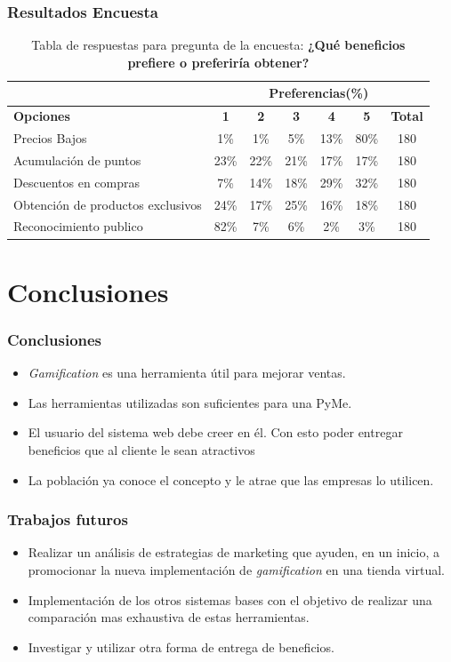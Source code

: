 \documentclass[10pt, compress]{beamer}
\begin{document}
\begin{frame}
 \frametitle{Resultados Encuesta}

\begin{table}[h]
\centering
\footnotesize
\begin{tabular}{|l|c|c|c|c|c|c|}
\hline
 & \multicolumn{6}{c|}{{\bf Preferencias(\%)}} \\
\hline
{\bf Opciones} & {\bf 1} & {\bf 2} & {\bf 3} & {\bf 4} & {\bf 5} & {\bf Total}\\
\hline
Precios Bajos & 1\% & 1\% & 5\% & 13\% & 80\% & 180\\
\hline
Acumulación de puntos & 23\% & 22\% & 21\% & 17\% & 17\% & 180\\
\hline
Descuentos en compras & 7\% & 14\% & 18\% & 29\% & 32\% & 180\\
\hline
Obtención de productos exclusivos & 24\% & 17\% & 25\% & 16\% & 18\% & 180\\
\hline
Reconocimiento publico & 82\% & 7\% & 6\% & 2\% & 3\% & 180\\
\hline
\end{tabular}
\caption{Tabla de respuestas para pregunta de la encuesta: {\bf ¿Qué beneficios prefiere o preferiría obtener?}}
\label{tab:Preg7}
\end{table}

\end{frame}

\section{Conclusiones}

\begin{frame}
 \frametitle{Conclusiones}

\begin{itemize}
\item \emph{Gamification} es una herramienta útil para mejorar ventas.
\item Las herramientas utilizadas son suficientes para una PyMe.
\item El usuario del sistema web debe creer en él. Con esto poder entregar beneficios que al cliente 
le sean atractivos 
\item La población ya conoce el concepto y le atrae que las empresas lo utilicen.
\end{itemize}
\end{frame}

\begin{frame}
 \frametitle{Trabajos futuros}

\begin{itemize}

\item Realizar un análisis de estrategias de marketing que ayuden, en un inicio, a promocionar la nueva 
implementación de \emph{gamification} en una tienda virtual.
\item Implementación de los otros sistemas bases con el objetivo de realizar una comparación mas exhaustiva
de estas herramientas.
\item Investigar y utilizar otra forma de entrega de beneficios.
\end{itemize}
\end{frame}

\end{document}
